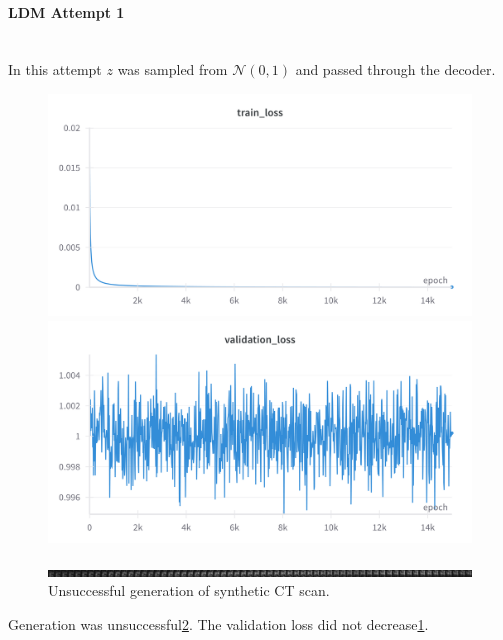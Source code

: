 \paragraph{LDM Attempt 1}\mbox{}\\

In this attempt $z$ was sampled from $\mathcal{N}(0,1)$ and passed through the decoder. 

\begin{figure}[H]
\includegraphics[width=\linewidth]{detailed_engineering/Monai Diffusion - Attempt 1/charts/train_loss.png}
\caption{}
\endminipage\hfill
{}
\includegraphics[width=\linewidth]{detailed_engineering/Monai Diffusion - Attempt 1/charts/validation_loss.png}
\caption{}
\label{fig:ldm_a1_val_loss}
\endminipage
\end{figure}


\begin{figure}[H]
\includegraphics[width=\linewidth]{detailed_engineering/Monai Diffusion - Attempt 1/charts/generation.png}
\caption{Unsuccessful generation of synthetic CT scan.}
\label{fig:attempt1-generation}
\end{figure}

Generation was unsuccessful\ref{fig:attempt1-generation}. The validation loss did not decrease\ref{fig:ldm_a1_val_loss}.
